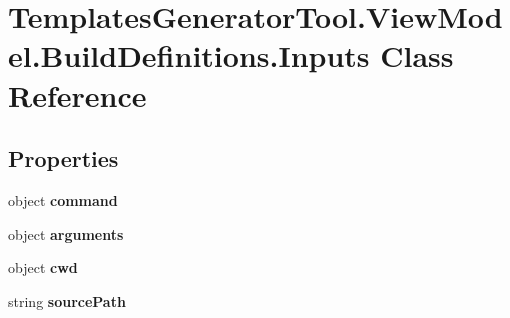 \hypertarget{class_templates_generator_tool_1_1_view_model_1_1_build_definitions_1_1_inputs}{}\section{Templates\+Generator\+Tool.\+View\+Model.\+Build\+Definitions.\+Inputs Class Reference}
\label{class_templates_generator_tool_1_1_view_model_1_1_build_definitions_1_1_inputs}
\subsection*{Properties}
\begin{DoxyCompactItemize}
\item 
\mbox{\label{class_templates_generator_tool_1_1_view_model_1_1_build_definitions_1_1_inputs_a8eaeefeee1fcfa5548004b7151d495f0}} 
object {\bfseries command}
\item 
\mbox{\label{class_templates_generator_tool_1_1_view_model_1_1_build_definitions_1_1_inputs_a6f83465add4c4d9d6deece66cea32805}} 
object {\bfseries arguments}
\item 
\mbox{\label{class_templates_generator_tool_1_1_view_model_1_1_build_definitions_1_1_inputs_aa84016163ac62dac258a9fa2f87eb49c}} 
object {\bfseries cwd}
\item 
\mbox{\label{class_templates_generator_tool_1_1_view_model_1_1_build_definitions_1_1_inputs_ae781bfacdd227299af74ad683cc22755}} 
string {\bfseries source\+Path}
\item 
\mbox{\label{class_templates_generator_tool_1_1_view_model_1_1_build_definitions_1_1_inputs_a3e7016a94ee2726b3723d478555d3de4}} 

\end{DoxyCompactItemize}
